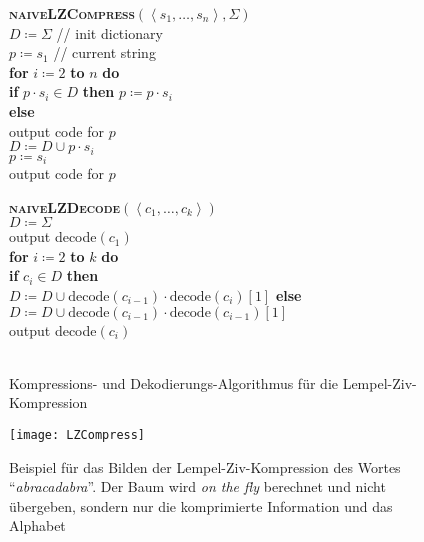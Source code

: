 \begin{figure}[H]
  \begin{minipage}{.42\textwidth}
    \begin{pseudocode}
      \textbf{\textsc{naiveLZCompress}}\( (\left\langle s_1,\dots,s_n \right\rangle, \Sigma) \) \\
      \( D \coloneqq \Sigma \) \quad // init dictionary \\
      \( p \coloneqq s_1 \) \quad // current string \\
      \textbf{for} \( i \coloneqq 2 \) \textbf{to} \( n \) \textbf{do} \\
      \phantom{\enskip} \textbf{if} \( p \cdot s_i \in D \) \textbf{then} \( p \coloneqq p \cdot s_i \) \\
      \phantom{\enskip} \textbf{else} \\
      \phantom{\enskip} \phantom{\enskip} output code for \( p \) \\
      \phantom{\enskip} \phantom{\enskip} \( D \coloneqq D \cup p \cdot s_i \) \\
      \phantom{\enskip} \phantom{\enskip} \( p \coloneqq s_i \) \\
      output code for \( p \)
    \end{pseudocode}
  \end{minipage}
  \begin{minipage}{.55\textwidth}
    \begin{pseudocode}
      \textbf{\textsc{naiveLZDecode}}\( (\left\langle c_1,\dots,c_k \right\rangle) \) \\
      \( D \coloneqq \Sigma \) \\
      output decode\( (c_1) \) \\
      \textbf{for} \( i \coloneqq 2 \) \textbf{to} \( k \) \textbf{do} \\
      \phantom{\enskip} \textbf{if} \( c_i \in D \) \textbf{then} \\
      \phantom{\enskip} \phantom{\enskip} \( D \coloneqq D \cup \text{decode}(c_{i-1}) \cdot \text{decode}(c_i)[1] \)
      \phantom{\enskip} \textbf{else} \\
      \phantom{\enskip} \phantom{\enskip} \( D \coloneqq D \cup \text{decode}(c_{i-1}) \cdot \text{decode}(c_{i-1})[1] \) \\
      \phantom{\enskip} output decode\( (c_i) \) \\
      \ 
    \end{pseudocode}
  \end{minipage}
  \caption{Kompressions- und Dekodierungs-Algorithmus für die Lempel-Ziv-Kompression}
\end{figure}

\begin{figure}[H]
  \texttt{[image: LZCompress]}
  \caption{Beispiel für das Bilden der Lempel-Ziv-Kompression des Wortes ``\emph{abracadabra}''. Der Baum wird \emph{on the fly} berechnet und nicht übergeben, sondern nur die komprimierte Information und das Alphabet}
\end{figure}